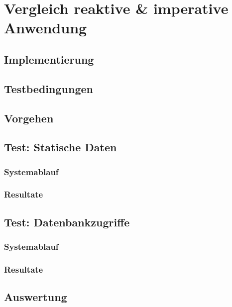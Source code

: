
\section {Vergleich reaktive \& imperative Anwendung}
\label{section:vergleich_reaktiv_imperativ}

\subsection{Implementierung}
\label{section:implementierung}

\subsection{Testbedingungen}
\label{section:testbedingungen}

\subsection{Vorgehen}
\label{section:vorgehen}

\subsection{Test: Statische Daten}
\label{section:statische_daten}

\subsubsection{Systemablauf}

\subsubsection{Resultate}

\subsection{Test: Datenbankzugriffe}
\label{section:datenbankzugriffe}

\subsubsection{Systemablauf}

\subsubsection{Resultate}

\subsection{Auswertung}
\label{section:auswertung}